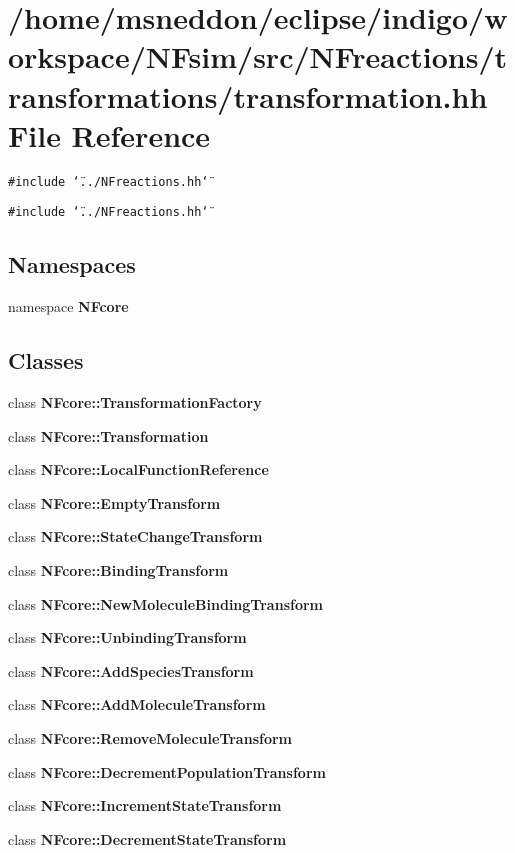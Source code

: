 \section{/home/msneddon/eclipse/indigo/workspace/NFsim/src/NFreactions/transformations/transformation.hh File Reference}
\label{transformation_8hh}


{\tt \#include \char`\"{}../NFreactions.hh\char`\"{}}\par
{\tt \#include \char`\"{}../NFreactions.hh\char`\"{}}\par
\subsection*{Namespaces}
\begin{CompactItemize}
\item 
namespace {\bf NFcore}
\end{CompactItemize}
\subsection*{Classes}
\begin{CompactItemize}
\item 
class {\bf NFcore::TransformationFactory}
\item 
class {\bf NFcore::Transformation}
\item 
class {\bf NFcore::LocalFunctionReference}
\item 
class {\bf NFcore::EmptyTransform}
\item 
class {\bf NFcore::StateChangeTransform}
\item 
class {\bf NFcore::BindingTransform}
\item 
class {\bf NFcore::NewMoleculeBindingTransform}
\item 
class {\bf NFcore::UnbindingTransform}
\item 
class {\bf NFcore::AddSpeciesTransform}
\item 
class {\bf NFcore::AddMoleculeTransform}
\item 
class {\bf NFcore::RemoveMoleculeTransform}
\item 
class {\bf NFcore::DecrementPopulationTransform}
\item 
class {\bf NFcore::IncrementStateTransform}
\item 
class {\bf NFcore::DecrementStateTransform}
\end{CompactItemize}
